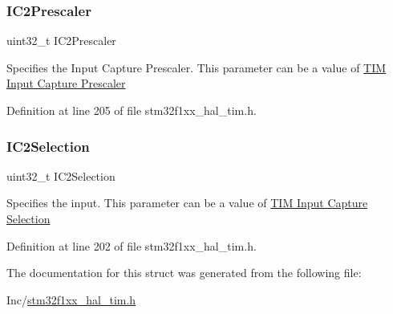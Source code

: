 \subsubsection{\texorpdfstring{I\+C2\+Prescaler}{IC2Prescaler}}
{\footnotesize\ttfamily uint32\+\_\+t I\+C2\+Prescaler}

Specifies the Input Capture Prescaler. This parameter can be a value of \hyperlink{group___t_i_m___input___capture___prescaler}{T\+IM Input Capture Prescaler} 

Definition at line 205 of file stm32f1xx\+\_\+hal\+\_\+tim.\+h.

\mbox{\label{struct_t_i_m___encoder___init_type_def_af5b15660e7593a0fa62ee00059b3a9f4}} 
\subsubsection{\texorpdfstring{I\+C2\+Selection}{IC2Selection}}
{\footnotesize\ttfamily uint32\+\_\+t I\+C2\+Selection}

Specifies the input. This parameter can be a value of \hyperlink{group___t_i_m___input___capture___selection}{T\+IM Input Capture Selection} 

Definition at line 202 of file stm32f1xx\+\_\+hal\+\_\+tim.\+h.



The documentation for this struct was generated from the following file\+:\begin{DoxyCompactItemize}
\item 
Inc/\hyperlink{stm32f1xx__hal__tim_8h}{stm32f1xx\+\_\+hal\+\_\+tim.\+h}\end{DoxyCompactItemize}

